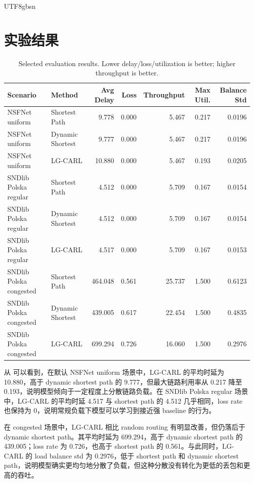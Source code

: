 \documentclass[9pt,a4paper,twocolumn,twoside]{rho-class/rho}
\begin{document}
\begin{CJK*}{UTF8}{gbsn}
\section{实验结果}

\begin{table}[t]
    \caption{Selected evaluation results. Lower delay/loss/utilization is better; higher throughput is better.}
    \label{tab:cn_results}
    \centering
    \begin{tabular}{llrrrrr}
        \toprule
        \textbf{Scenario} & \textbf{Method} & \textbf{Avg Delay} & \textbf{Loss} & \textbf{Throughput} & \textbf{Max Util.} & \textbf{Balance Std} \\
        \midrule
        NSFNet uniform & Shortest Path & 9.778 & 0.000 & 5.467 & 0.217 & 0.0196 \\
        NSFNet uniform & Dynamic Shortest & 9.777 & 0.000 & 5.467 & 0.217 & 0.0196 \\
        NSFNet uniform & LG-CARL & 10.880 & 0.000 & 5.467 & 0.193 & 0.0205 \\
        SNDlib Polska regular & Shortest Path & 4.512 & 0.000 & 5.709 & 0.167 & 0.0154 \\
        SNDlib Polska regular & Dynamic Shortest & 4.512 & 0.000 & 5.709 & 0.167 & 0.0154 \\
        SNDlib Polska regular & LG-CARL & 4.517 & 0.000 & 5.709 & 0.167 & 0.0153 \\
        SNDlib Polska congested & Shortest Path & 464.048 & 0.561 & 25.737 & 1.500 & 0.6123 \\
        SNDlib Polska congested & Dynamic Shortest & 439.005 & 0.617 & 22.454 & 1.500 & 0.4835 \\
        SNDlib Polska congested & LG-CARL & 699.294 & 0.726 & 16.060 & 1.500 & 0.2976 \\
        \bottomrule
    \end{tabular}
\end{table}

从  可以看到，在默认 NSFNet uniform 场景中，LG-CARL 的平均时延为 10.880，高于 dynamic shortest path 的 9.777，但最大链路利用率从 0.217 降至 0.193，说明模型倾向于一定程度上分散链路负载。在 SNDlib Polska regular 场景中，LG-CARL 的平均时延 4.517 与 shortest path 的 4.512 几乎相同，loss rate 也保持为 0，说明常规负载下模型可以学习到接近强 baseline 的行为。

在 congested 场景中，LG-CARL 相比 random routing 有明显改善，但仍落后于 dynamic shortest path。其平均时延为 699.294，高于 dynamic shortest path 的 439.005；loss rate 为 0.726，也高于 shortest path 的 0.561。与此同时，LG-CARL 的 load balance std 为 0.2976，低于 shortest path 和 dynamic shortest path，说明模型确实更均匀地分散了负载，但这种分散没有转化为更低的丢包和更高的吞吐。


\end{CJK*}
\end{document}
